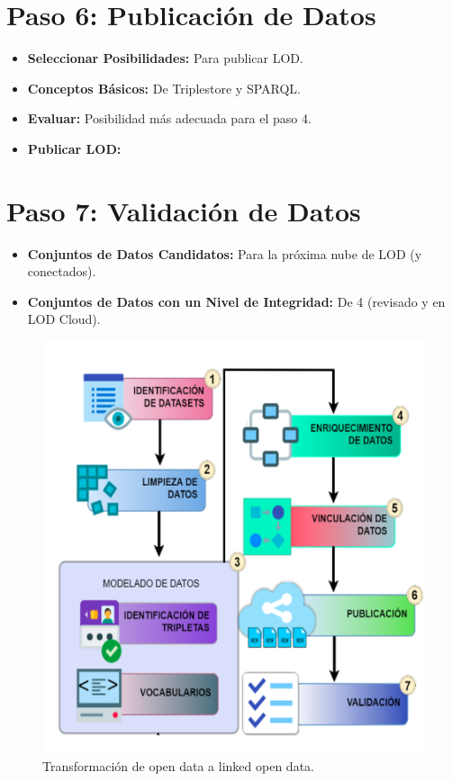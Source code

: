 \documentclass[11pt]{report}
\begin{document}
		\section{Paso 6: Publicación de Datos}
		\begin{itemize}
			\item \textbf{Seleccionar Posibilidades:} Para publicar LOD.
			
			\item \textbf{Conceptos Básicos:} De Triplestore y SPARQL.
			
			\item \textbf{Evaluar:} Posibilidad más adecuada para el paso 4.
			
			\item \textbf{Publicar LOD:}
		\end{itemize}
		\section{Paso 7: Validación de Datos}
		\begin{itemize}
			\item \textbf{Conjuntos de Datos Candidatos:} Para la próxima nube de LOD (y conectados).
			
			\item \textbf{Conjuntos de Datos con un Nivel de Integridad:} De 4 (revisado y en LOD Cloud).
		\end{itemize}

		\begin{figure}[H]
			\centering
			\includegraphics[scale=0.09]{../img/od-lod1.png} %
			\caption{Transformación de open data a linked open data.}
			\label{fig:od->lod}
		\end{figure}
\end{document}
